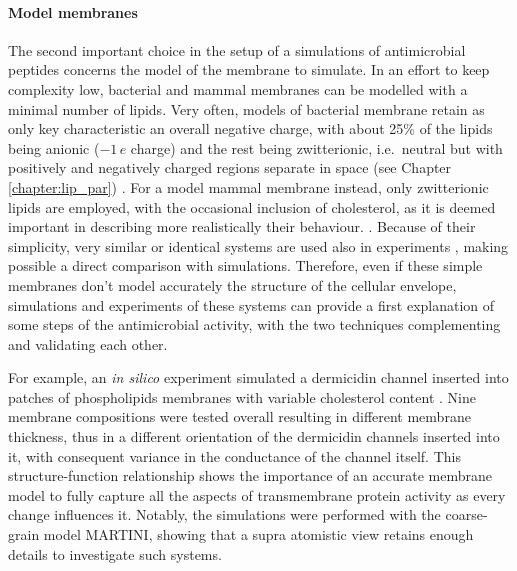 \paragraph{Model membranes} The second important choice in the setup of a simulations of antimicrobial peptides concerns the model of the membrane to simulate. In an effort to keep complexity low, bacterial and mammal membranes can be modelled with a minimal number of lipids.
%
Very often, models of bacterial membrane retain as only key characteristic an overall negative charge, with about 25\% of the lipids being anionic ($-1\,e$ charge) and the rest being zwitterionic, i.e.\ neutral but with positively and negatively charged regions separate in space (see Chapter \ref{chapter:lip_par}) \cite{Lipkin2017,Wang2012,Zhao2018,Chen2019}.
For a model mammal membrane instead, only zwitterionic lipids are employed, with the occasional inclusion of cholesterol, as it is deemed important in describing more realistically their behaviour. \cite{Lipkin2017,Wang2012,Zhao2018,Chen2019,Risselada2008}.
Because of their simplicity, very similar or identical systems are used also in experiments \cite{Castelletto2016,Tang2009,Glukhov2005}, making possible a direct comparison with simulations.
Therefore, even if these simple membranes don't model accurately the structure of the cellular envelope, simulations and experiments of these systems can provide a first explanation of some steps of the antimicrobial activity, with the two techniques complementing and validating each other.

For example, an \emph{in silico} experiment simulated a dermicidin channel inserted into patches of phospholipids membranes with variable cholesterol content \cite{Song2019}. Nine membrane compositions were tested overall resulting in different membrane thickness, thus in a different orientation of the dermicidin channels inserted into it, with consequent variance in the conductance of the channel itself. This structure-function relationship shows the importance of an accurate membrane model to fully capture all the aspects of transmembrane protein activity as every change influences it. Notably, the simulations were performed with the coarse-grain model MARTINI, showing that a supra atomistic view retains enough details to investigate such systems.

